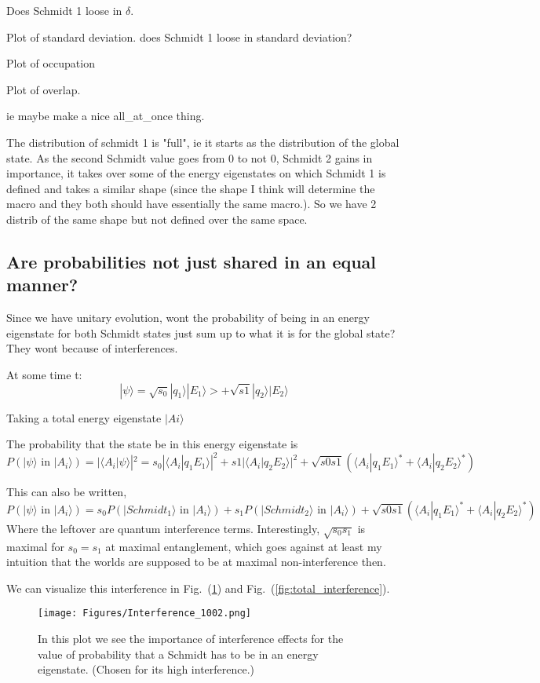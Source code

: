 \documentclass{article}
\begin{document}
Does Schmidt 1 loose in $\delta$. 


Plot of standard deviation. does Schmidt 1 loose in standard deviation? 


Plot of occupation

Plot of overlap.

ie maybe make a nice all_at_once thing.






The distribution of schmidt 1 is "full", ie it starts as the distribution of the global state. As the second Schmidt value goes from 0 to not 0, Schmidt 2 gains in importance, it takes over some of the energy eigenstates on which Schmidt 1 is defined and takes a similar shape (since the shape I think will determine the macro and they both should have essentially the same macro.). So we have 2 distrib of the same shape but not defined over the same space.


\subsection{Are probabilities not just shared in an equal manner?}
Since we have unitary evolution, wont the probability of being in an energy eigenstate for both Schmidt states just sum up to what it is for the global state? They wont because of interferences.

At some time t:
$$|\psi\rangle=\sqrt{s_0}|q_1\rangle|E_1\rangle>+\sqrt{s1}|q_2\rangle|E_2\rangle$$

Taking a total energy eigenstate $|Ai\rangle$

The probability that the state be in this energy eigenstate is 
$$P(|\psi\rangle \text{ in } |A_i\rangle)=|\langle A_i|\psi\rangle|^2 = s_0|\langle A_i|q_1E_1\rangle|^2+s1|\langle A_i|q_2E_2\rangle|^2+\sqrt{s0s1}(\langle A_i|q_1E_1\rangle^*+\langle A_i|q_2E_2\rangle^*)$$

This can also be written,
$$P(|\psi\rangle \text{ in } |A_i\rangle)= s_0P(|Schmidt_1\rangle\text{ in }|A_i\rangle)+ s_1P(|Schmidt_2\rangle\text{ in }|A_i\rangle) +\sqrt{s0s1}(\langle A_i|q_1E_1\rangle^*+\langle A_i|q_2E_2\rangle^*)$$
Where the leftover are quantum interference terms.
Interestingly, $\sqrt{s_0s_1}$ is maximal for $s_0=s_1$ at maximal entanglement, which goes against at least my intuition that the  worlds are supposed to be at maximal non-interference then.

We can visualize this interference in Fig.~(\ref{fig:interf1002}) and Fig.~(\ref{fig:total_interference}).
\begin{figure}
    \centering
    \texttt{[image: Figures/Interference\_1002.png]}
    \caption{In this plot we see the importance of interference effects for the value of probability that a Schmidt has to be in an energy eigenstate. (Chosen for its high interference.)}
    \label{fig:interf1002}
\end{figure}
\end{document}
